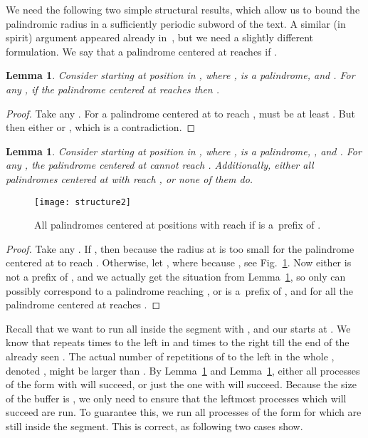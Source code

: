 \documentclass{article}[11pt,letter]
\newtheorem{lemma}[definition]{Lemma}
\begin{document}
We need the following two simple structural results, which allow us to bound the palindromic radius in a sufficiently periodic subword of the
text. A similar (in spirit) argument appeared already in~\cite{Apostolico}, but we need a slightly different formulation. We say that a palindrome
centered at  reaches  if .

\begin{lemma}
\label{lemma:structure1}
Consider  starting at position  in , where ,  is a palindrome, and .
For any , if the palindrome centered at  reaches  then .
\end{lemma}

\begin{proof}
Take any . For a palindrome centered at  to reach ,  must be at least
. But then either  or , which is a contradiction.
\end{proof}

\begin{lemma}
\label{lemma:structure2}
Consider  starting at position  in , where ,  is a palindrome, , and .
For any , the palindrome centered at  cannot reach .
Additionally, either all palindromes centered at  with  reach , or none of them do.
\end{lemma}

\begin{figure}[t]
\texttt{[image: structure2]}
\caption{All palindromes centered at positions  with  reach  if  is a~prefix of .}
\label{fig:structure2}
\end{figure}

\begin{proof}
Take any . If , then because  the radius at  is too small
for the palindrome centered at  to reach .
Otherwise, let , where  because , see
Fig.~\ref{fig:structure2}. Now either  is not a prefix
of , and we actually get the situation from Lemma~\ref{lemma:structure1}, so only  can possibly correspond
to a palindrome reaching , or 
is a~prefix of , and for all  the palindrome centered at  reaches .
\end{proof}

Recall that we want to run all  inside the segment with , and our  starts at .
We know that  repeats  times to the left in  and  times to the right till the end of the
already seen . The actual number of repetitions of  to the left in the whole , denoted ,
might be larger than . By Lemma~\ref{lemma:structure1} and Lemma~\ref{lemma:structure2}, either all processes of the form
 with  will succeed, or just the one with
 will succeed. Because the size of the buffer is , we only need to ensure that the  leftmost
processes which will succeed are run.
To guarantee this, we run all processes of the form  for 
which are still inside the segment.
This is correct, as following two cases show.
\end{document}
